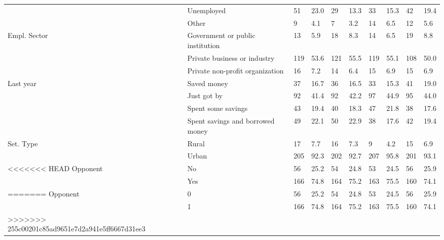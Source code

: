 \begin{table}
\begin{tabular}[t]{llllllllll}
 & Unemployed & 51 & 23.0 & 29 & 13.3 & 33 & 15.3 & 42 & 19.4\\
 & Other & 9 & 4.1 & 7 & 3.2 & 14 & 6.5 & 12 & 5.6\\
Empl. Sector & Government or public institution & 13 & 5.9 & 18 & 8.3 & 14 & 6.5 & 19 & 8.8\\
 & Private business or industry & 119 & 53.6 & 121 & 55.5 & 119 & 55.1 & 108 & 50.0\\
 & Private non-profit organization & 16 & 7.2 & 14 & 6.4 & 15 & 6.9 & 15 & 6.9\\
Last year & Saved money & 37 & 16.7 & 36 & 16.5 & 33 & 15.3 & 41 & 19.0\\
 & Just got by & 92 & 41.4 & 92 & 42.2 & 97 & 44.9 & 95 & 44.0\\
 & Spent some savings & 43 & 19.4 & 40 & 18.3 & 47 & 21.8 & 38 & 17.6\\
 & Spent savings and
borrowed money & 49 & 22.1 & 50 & 22.9 & 38 & 17.6 & 42 & 19.4\\
Set. Type & Rural & 17 & 7.7 & 16 & 7.3 & 9 & 4.2 & 15 & 6.9\\
 & Urban & 205 & 92.3 & 202 & 92.7 & 207 & 95.8 & 201 & 93.1\\
<<<<<<< HEAD
Opponent & No & 56 & 25.2 & 54 & 24.8 & 53 & 24.5 & 56 & 25.9\\
 & Yes & 166 & 74.8 & 164 & 75.2 & 163 & 75.5 & 160 & 74.1\\
=======
Opponent & 0 & 56 & 25.2 & 54 & 24.8 & 53 & 24.5 & 56 & 25.9\\
 & 1 & 166 & 74.8 & 164 & 75.2 & 163 & 75.5 & 160 & 74.1\\
>>>>>>> 255c00201c85ad9651e7d2a941e5ff6667d31ee3
\bottomrule
\end{tabular}
\end{table}
